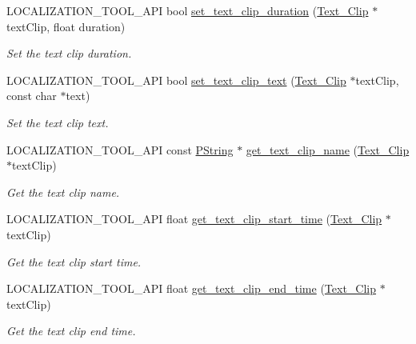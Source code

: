 \begin{DoxyCompactItemize}
L\+O\+C\+A\+L\+I\+Z\+A\+T\+I\+O\+N\+\_\+\+T\+O\+O\+L\+\_\+\+A\+PI bool \mbox{\hyperlink{namespaceprz_a0b38209c4d846727812a74f44085daef}{set\+\_\+text\+\_\+clip\+\_\+duration}} (\mbox{\hyperlink{classprz_1_1_text___clip}{Text\+\_\+\+Clip}} $\ast$text\+Clip, float duration)
\begin{DoxyCompactList}\small\item\em Set the text clip duration. \end{DoxyCompactList}\item 
L\+O\+C\+A\+L\+I\+Z\+A\+T\+I\+O\+N\+\_\+\+T\+O\+O\+L\+\_\+\+A\+PI bool \mbox{\hyperlink{namespaceprz_add7a0ed63b75c519ee18b435f6883f50}{set\+\_\+text\+\_\+clip\+\_\+text}} (\mbox{\hyperlink{classprz_1_1_text___clip}{Text\+\_\+\+Clip}} $\ast$text\+Clip, const char $\ast$text)
\begin{DoxyCompactList}\small\item\em Set the text clip text. \end{DoxyCompactList}\item 
L\+O\+C\+A\+L\+I\+Z\+A\+T\+I\+O\+N\+\_\+\+T\+O\+O\+L\+\_\+\+A\+PI const \mbox{\hyperlink{classprz_1_1_p_string}{P\+String}} $\ast$ \mbox{\hyperlink{namespaceprz_a87875ccb3d758a8061f6e9985fcb6780}{get\+\_\+text\+\_\+clip\+\_\+name}} (\mbox{\hyperlink{classprz_1_1_text___clip}{Text\+\_\+\+Clip}} $\ast$text\+Clip)
\begin{DoxyCompactList}\small\item\em Get the text clip name. \end{DoxyCompactList}\item 
L\+O\+C\+A\+L\+I\+Z\+A\+T\+I\+O\+N\+\_\+\+T\+O\+O\+L\+\_\+\+A\+PI float \mbox{\hyperlink{namespaceprz_a616eb57f615a3c7b942e33139a30b25a}{get\+\_\+text\+\_\+clip\+\_\+start\+\_\+time}} (\mbox{\hyperlink{classprz_1_1_text___clip}{Text\+\_\+\+Clip}} $\ast$text\+Clip)
\begin{DoxyCompactList}\small\item\em Get the text clip start time. \end{DoxyCompactList}\item 
L\+O\+C\+A\+L\+I\+Z\+A\+T\+I\+O\+N\+\_\+\+T\+O\+O\+L\+\_\+\+A\+PI float \mbox{\hyperlink{namespaceprz_a6c9111d61f5d8a4089c0dce9b8503f28}{get\+\_\+text\+\_\+clip\+\_\+end\+\_\+time}} (\mbox{\hyperlink{classprz_1_1_text___clip}{Text\+\_\+\+Clip}} $\ast$text\+Clip)
\begin{DoxyCompactList}\small\item\em Get the text clip end time. \end{DoxyCompactList}\item 

\end{DoxyCompactItemize}
